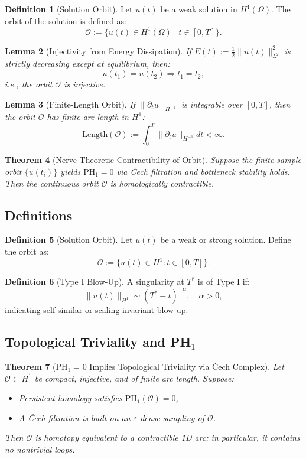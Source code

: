 \documentclass[11pt]{article}
\newtheorem{theorem}{Theorem}[section]
\newtheorem{lemma}[theorem]{Lemma}
\theoremstyle{definition}
\newtheorem{definition}[theorem]{Definition}
\begin{document}
\begin{definition}[Solution Orbit]
Let $u(t)$ be a weak solution in $H^1(\Omega)$. The orbit of the solution is defined as:
\[
\mathcal{O} := \{ u(t) \in H^1(\Omega) \mid t \in [0,T] \}.
\]
\end{definition}

\begin{lemma}[Injectivity from Energy Dissipation]
If $E(t) := \frac{1}{2} \| u(t) \|_{L^2}^2$ is strictly decreasing except at equilibrium, then:
\[
u(t_1) = u(t_2) \Rightarrow t_1 = t_2,
\]
i.e., the orbit $\mathcal{O}$ is injective.
\end{lemma}

\begin{lemma}[Finite-Length Orbit]
If $\| \partial_t u \|_{H^{-1}}$ is integrable over $[0,T]$, then the orbit $\mathcal{O}$ has finite arc length in $H^1$:
\[
\mathrm{Length}(\mathcal{O}) := \int_0^T \| \partial_t u \|_{H^{-1}} dt < \infty.
\]
\end{lemma}

\begin{theorem}[Nerve-Theoretic Contractibility of Orbit]
Suppose the finite-sample orbit $\{u(t_i)\}$ yields $\mathrm{PH}_1 = 0$ via Čech filtration and bottleneck stability holds. Then the continuous orbit $\mathcal{O}$ is homologically contractible.
\end{theorem}

\subsection{Definitions}

\begin{definition}[Solution Orbit]
Let $u(t)$ be a weak or strong solution. Define the orbit as:
\[
\mathcal{O} := \{u(t) \in H^1 : t \in [0,T]\}.
\]
\end{definition}

\begin{definition}[Type I Blow-Up]
A singularity at $T^*$ is of Type I if:
\[
\|u(t)\|_{H^1} \sim (T^* - t)^{-\alpha}, \quad \alpha > 0,
\]
indicating self-similar or scaling-invariant blow-up.
\end{definition}

\subsection{Topological Triviality and PH$_1$}

\begin{theorem}[PH₁ = 0 Implies Topological Triviality via Čech Complex]
\label{thm:cech-triviality}
Let $\mathcal{O} \subset H^1$ be compact, injective, and of finite arc length. Suppose:
\begin{itemize}
  \item Persistent homology satisfies $\mathrm{PH}_1(\mathcal{O}) = 0$,
  \item A Čech filtration is built on an $\varepsilon$-dense sampling of $\mathcal{O}$.
\end{itemize}
Then $\mathcal{O}$ is homotopy equivalent to a contractible 1D arc; in particular, it contains no nontrivial loops.
\end{theorem}
\end{document}
